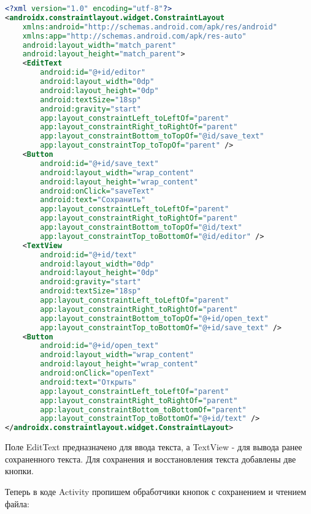 \begin{lstlisting}[language=XML
	, label=lst:
	]
<?xml version="1.0" encoding="utf-8"?>
<androidx.constraintlayout.widget.ConstraintLayout
    xmlns:android="http://schemas.android.com/apk/res/android"
    xmlns:app="http://schemas.android.com/apk/res-auto"
    android:layout_width="match_parent"
    android:layout_height="match_parent">
    <EditText
        android:id="@+id/editor"
        android:layout_width="0dp"
        android:layout_height="0dp"
        android:textSize="18sp"
        android:gravity="start"
        app:layout_constraintLeft_toLeftOf="parent"
        app:layout_constraintRight_toRightOf="parent"
        app:layout_constraintBottom_toTopOf="@id/save_text"
        app:layout_constraintTop_toTopOf="parent" />
    <Button
        android:id="@+id/save_text"
        android:layout_width="wrap_content"
        android:layout_height="wrap_content"
        android:onClick="saveText"
        android:text="Сохранить"
        app:layout_constraintLeft_toLeftOf="parent"
        app:layout_constraintRight_toRightOf="parent"
        app:layout_constraintBottom_toTopOf="@id/text"
        app:layout_constraintTop_toBottomOf="@id/editor" />
    <TextView
        android:id="@+id/text"
        android:layout_width="0dp"
        android:layout_height="0dp"
        android:gravity="start"
        android:textSize="18sp"
        app:layout_constraintLeft_toLeftOf="parent"
        app:layout_constraintRight_toRightOf="parent"
        app:layout_constraintBottom_toTopOf="@+id/open_text"
        app:layout_constraintTop_toBottomOf="@+id/save_text" />
    <Button
        android:id="@+id/open_text"
        android:layout_width="wrap_content"
        android:layout_height="wrap_content"
        android:onClick="openText"
        android:text="Открыть"
        app:layout_constraintLeft_toLeftOf="parent"
        app:layout_constraintRight_toRightOf="parent"
        app:layout_constraintBottom_toBottomOf="parent"
        app:layout_constraintTop_toBottomOf="@+id/text" />
</androidx.constraintlayout.widget.ConstraintLayout>
\end{lstlisting}

Поле EditText предназначено для ввода текста, а TextView - для вывода ранее
сохраненного текста. Для сохранения и восстановления текста добавлены две
кнопки.\par
Теперь в коде Activity пропишем обработчики кнопок с сохранением и
чтением файла:

